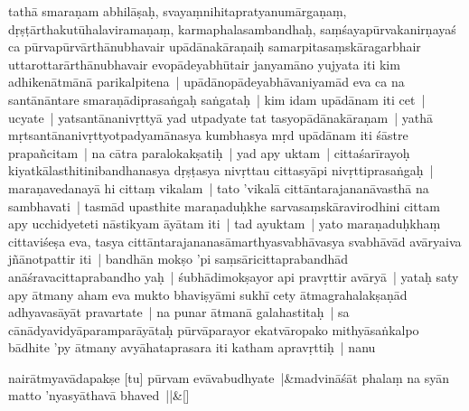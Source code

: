 \documentclass[article,12pt,a4paper]{memoir}%
\newcounter{parCount}
\begin{document}
	  
	  \pstart \leavevmode%
	\label{thakur75-127.10}tathā smaraṇam abhilāṣaḥ, svayaṃnihitapratyanumārgaṇaṃ, dṛṣṭārthakutūhalaviramaṇaṃ, karmaphalasambandhaḥ, saṃśayapūrvakanirṇayaś ca pūrvapūrvārthānubhavair upādānakāraṇaiḥ samarpitasaṃskāragarbhair uttarottarārthānubhavair evopādeyabhūtair janyamāno yujyata iti kim adhikenātmānā parikalpitena | \label{thakur75-127.13} upādānopādeyabhāvaniyamād eva ca na santānāntare smaraṇādiprasaṅgaḥ saṅgataḥ | kim idam upādānam iti cet | \label{thakur75-127.14} ucyate | yatsantānanivṛttyā yad utpadyate tat tasyopādānakāraṇam | yathā mṛtsantānanivṛttyotpadyamānasya kumbhasya mṛd upādānam iti śāstre prapañcitam | na cātra paralokakṣatiḥ | \label{thakur75-127.17} yad apy uktam | cittaśarīrayoḥ kiyatkālasthitinibandhanasya dṛṣṭasya nivṛttau cittasyāpi nivṛttiprasaṅgaḥ | maraṇavedanayā hi cittaṃ vikalam | tato 'vikalā cittāntarajananāvasthā na sambhavati | tasmād upasthite maraṇaduḥkhe sarvasaṃskāravirodhini cittam apy ucchidyeteti nāstikyam āyātam iti | \label{thakur75-127.20} tad ayuktam | yato maraṇaduḥkhaṃ cittaviśeṣa eva, tasya cittāntarajananasāmarthyasvabhāvasya svabhāvād avāryaiva jñānotpattir iti | \label{thakur75-127.22} bandhān mokṣo 'pi saṃsāricittaprabandhād anāśravacittaprabandho yaḥ | \label{thakur75-127.23} śubhādimokṣayor api pravṛttir avāryā | yataḥ saty apy ātmany aham eva mukto bhaviṣyāmi sukhī cety ātmagrahalakṣaṇād adhyavasāyāt pravartate | na punar ātmanā galahastitaḥ | sa cānādyavidyāparamparāyātaḥ pūrvāparayor ekatvāropako mithyāsaṅkalpo bādhite 'py ātmany avyāhataprasara iti katham apravṛttiḥ | \label{thakur75-127.26} nanu
	{}
	\pend%
      
	    
	    \stanza[\smallbreak]
	  nairātmyavādapakṣe [tu] pūrvam evāvabudhyate |&madvināśāt phalaṃ na syān matto 'nyasyāthavā bhaved ||\&[\smallbreak]
	  
	  
	  
\end{document}
